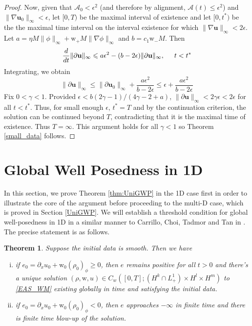 \documentclass[11pt,letterpaper]{amsart}
\theoremstyle{plain}
\newtheorem{theorem}[THEOREM]{Theorem}
\theoremstyle{definition}
\theoremstyle{remark}
\def \cA {\mathcal{A}}
\renewcommand{\geq}{\geqslant}
\renewcommand{\leq}{\leqslant}
\def\u{\textbf{u}}
\def \wt {\mathrm{w}}
\begin{document}
\begin{proof}
    Now, given that $\mathcal{A}_0 < \epsilon^2$ (and therefore by alignment, 
    $\cA(t) \leq \epsilon^2$) and $\|\nabla \u_0\|_{\infty} < \epsilon$,
    let $[0,T)$ be the maximal interval of existence and let $[0, t^*)$ be the the maximal time interval on the interval existence
    for which $\|\nabla \u\|_{\infty} < 2 \epsilon$. 
    Let $a = \eta  M \|\phi\|_{\infty} + \wt_+ M \|\nabla \phi\|_{\infty}$ and $b = c_1 \wt_- M$. 
    Then 
    \begin{equation*}
        \frac{d}{dt} \|\partial \u\|_{\infty} 
            \leq a \epsilon^2 - (b - 2\epsilon) \|\partial \u \|_{\infty}, \hspace{5mm} t < t^*
    \end{equation*}
    Integrating, we obtain 
    \begin{equation*}
        \|\partial \u\|_{\infty} \leq  \|\partial \u_0\|_{\infty} + \frac{a \epsilon^2}{b-2\epsilon}
            \leq \epsilon + \frac{a \epsilon^2}{b-2\epsilon}
    \end{equation*}
    Fix $0 < \gamma < 1$. Provided $\epsilon < b(2\gamma - 1)/(4\gamma - 2 + a)$, $\|\partial \u\|_{\infty} < 2 \gamma \epsilon < 2 \epsilon$ for all $t < t^*$. 
    Thus, for small enough $\epsilon$, $t^* = T$ and by the continuation criterion, the solution can be continued beyond $T$, contradicting that it is the maximal time of existence. 
    Thus $T = \infty$.  
    This argument holds for all $\gamma < 1$ so Theorem \ref{small_data} follows. 
\end{proof}






\section{Global Well Posedness in 1D}
\label{GWP_1D}
In this section, 
we prove Theorem \ref{thm:UniGWP} in the 1D case first in order to illustrate the core of the argument before proceeding to the multi-D case, which is proved in Section \ref{UniGWP}. 
We will establish a threshold condition for global well-posedness in 1D 
in a similar manner to Carrillo, Choi, Tadmor and Tan in \cite{CCTT2016}.
The precise statement is as follows. 
\begin{theorem}
    \label{t:GWP_1D}
    Suppose the initial data is smooth.  Then we have 
    \begin{enumerate}[(i)]
        \item if $e_0 = \partial_x u_0 + \wt_0 (\rho_0)_{\phi} \geq 0$, then $e$ remains positive for all $t>0$ and there's a unique solution 
        $(\rho, \wt, u) \in C_w([0,T]; (H^k \cap L^1_+) \times H^l \times H^m)$ to \eqref{EAS_WM}
        existing globally in time and satisfying the initial data. 
        \item if $e_0 = \partial_x u_0 + \wt_0 (\rho_0)_{\phi} < 0$, then $e$ approaches $-\infty$ in finite time and there is finite time blow-up 
        of the solution.
    \end{enumerate}
\end{theorem}
\end{document}
